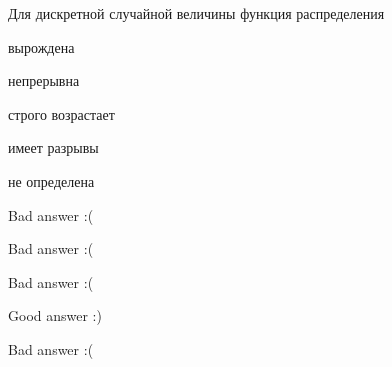 
\begin{question}
Для дискретной случайной величины функция распределения
\begin{answerlist}
  \item вырождена
  \item непрерывна
  \item строго возрастает
  \item имеет разрывы
  \item не определена
\end{answerlist}
\end{question}

\begin{solution}
\begin{answerlist}
  \item Bad answer :(
  \item Bad answer :(
  \item Bad answer :(
  \item Good answer :)
  \item Bad answer :(
\end{answerlist}
\end{solution}

